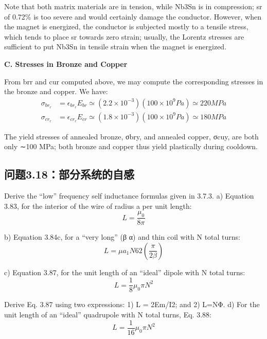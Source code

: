 Note that both matrix materials are in tension, while Nb3Sn is in compression; sr
of 0.72\% is too severe and would certainly damage the conductor. However, when
the magnet is energized, the conductor is subjected mostly to a tensile stress, which
tends to place sr towards zero strain; usually, the Lorentz stresses are sufficient
to put Nb3Sn in tensile strain when the magnet is energized.

\textbf{C. Stresses in Bronze and Copper}

From brr and cur computed above, we may compute the corresponding stresses
in the bronze and copper. We have:
 \begin{eqnarray*}
\sigma_{br_r}&=\epsilon_{br_r}E_{br}\simeq(2.2\times10^{-3})(100\times10^9Pa)\simeq220MPa\\
\sigma_{cr_r}&=\epsilon_{cr_r}E_{cr}\simeq(1.8\times10^{-3})(100\times10^9Pa)\simeq180MPa
\end{eqnarray*}

The yield stresses of annealed bronze, σbry, and annealed copper, σcuy, are both
only ∼100 MPa; both bronze and copper thus yield plastically during cooldown.


\newpage



\subsection{问题3.18：部分系统的自感}
Derive the “low” frequency self inductance formulas given in 3.7.3.
a) Equation 3.83, for the interior of the wire of radius a per unit length:
 \begin{equation}%
L=\frac{\mu_0}{8\pi}
\end{equation}

b) Equation 3.84c, for a “very long” (β α) and thin coil with N total turns:
 \begin{equation}%
L=\mu a_1N62(\frac{\pi}{2\beta})
\end{equation}

c) Equation 3.87, for the unit length of an “ideal” dipole with N total turns:
 \begin{equation}%
L=\frac{1}{8}\mu_0\pi N^2
\end{equation}

Derive Eq. 3.87 using two expressions: 1) L = 2Em/I2; and 2) L=NΦ.
d) For the unit length of an “ideal” quadrupole with N total turns, Eq. 3.88:
 \begin{equation}%
L=\frac{1}{16}\mu_0\pi N^2
\end{equation}

